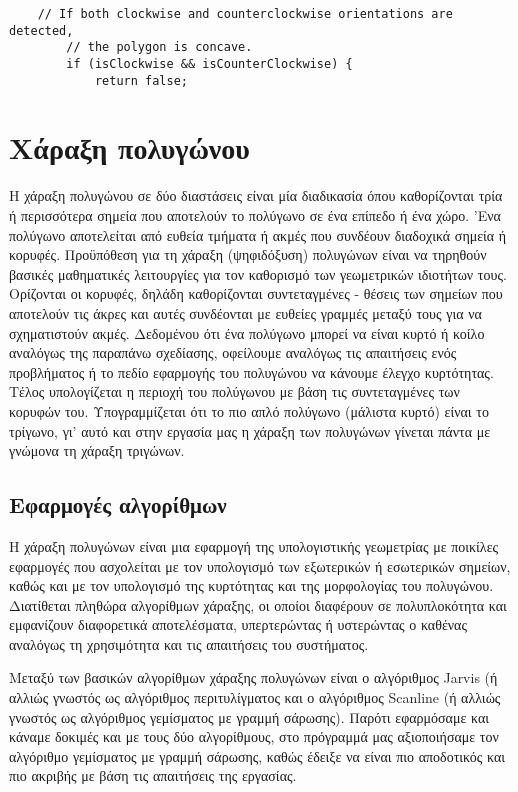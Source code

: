 \begin{verbatim}
    // If both clockwise and counterclockwise orientations are detected,
        // the polygon is concave.
        if (isClockwise && isCounterClockwise) {
            return false;
\end{verbatim}

\section{Χάραξη πολυγώνου}

Η χάραξη πολυγώνου σε δύο διαστάσεις είναι μία διαδικασία όπου καθορίζονται τρία ή περισσότερα σημεία που αποτελούν το πολύγωνο σε ένα επίπεδο ή ένα χώρο. 'Ενα πολύγωνο αποτελείται από ευθεία τμήματα ή ακμές που συνδέουν διαδοχικά σημεία ή κορυφές. Προϋπόθεση για τη χάραξη (ψηφιδόξυση) πολυγώνων είναι να τηρηθούν βασικές μαθηματικές λειτουργίες για τον καθορισμό των γεωμετρικών ιδιοτήτων τους. Ορίζονται οι κορυφές, δηλάδη καθορίζονται συντεταγμένες - θέσεις των σημείων που αποτελούν τις άκρες και αυτές συνδέονται με ευθείες γραμμές μεταξύ τους για να σχηματιστούν ακμές. Δεδομένου ότι ένα πολύγωνο μπορεί να είναι κυρτό ή κοίλο αναλόγως της παραπάνω σχεδίασης, οφείλουμε αναλόγως τις απαιτήσεις ενός προβλήματος ή το πεδίο εφαρμογής του πολυγώνου να κάνουμε έλεγχο κυρτότητας. Τέλος υπολογίζεται η περιοχή του πολύγωνου με βάση τις συντεταγμένες των κορυφών του. Υπογραμμίζεται ότι το πιο απλό πολύγωνο (μάλιστα κυρτό) είναι το τρίγωνο, γι' αυτό και στην εργασία μας η χάραξη των πολυγώνων γίνεται πάντα με γνώμονα τη χάραξη τριγώνων.  

\subsection{Εφαρμογές αλγορίθμων}

Η χάραξη πολυγώνων είναι μια εφαρμογή της υπολογιστικής γεωμετρίας με ποικίλες εφαρμογές που ασχολείται με τον υπολογισμό των εξωτερικών ή εσωτερικών σημείων, καθώς και με τον υπολογισμό της κυρτότητας και της μορφολογίας του πολυγώνου. Διατίθεται πληθώρα αλγορίθμων χάραξης, οι οποίοι διαφέρουν σε πολυπλοκότητα και εμφανίζουν διαφορετικά αποτελέσματα, υπερτερώντας ή υστερώντας ο καθένας αναλόγως τη χρησιμότητα και τις απαιτήσεις του συστήματος. 
\par

Μεταξύ των βασικών αλγορίθμων χάραξης πολυγώνων είναι ο αλγόριθμος \textlatin{Jarvis} (ή αλλιώς γνωστός ως αλγόριθμος περιτυλίγματος και ο αλγόριθμος \textlatin{Scanline} (ή αλλιώς γνωστός ως αλγόριθμος γεμίσματος με γραμμή σάρωσης). Παρότι εφαρμόσαμε και κάναμε δοκιμές και με τους δύο αλγορίθμους, στο πρόγραμμά μας αξιοποιήσαμε τον αλγόριθμο γεμίσματος με γραμμή σάρωσης, καθώς έδειξε να είναι πιο αποδοτικός και πιο ακριβής με βάση τις απαιτήσεις της εργασίας.  

